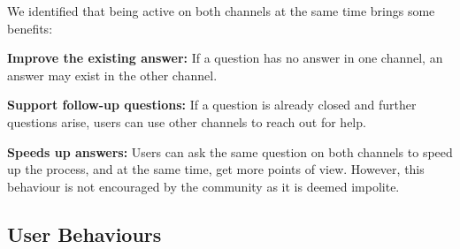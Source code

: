     We identified that being active on both channels at the same time brings some benefits:
    \begin{packed_enum}
        \item \textbf{Improve the existing answer:} If a question has no answer in one channel, an answer may exist in the other channel.
        \item \textbf{Support follow-up questions:} If a question is already closed and further questions arise, users can use other channels to reach out for help.
        \item \textbf{Speeds up answers:} Users can ask the same question on both channels to speed up the process, and at the same time, get more points of view. However, this behaviour is not encouraged by the community as it is deemed impolite.
    \end{packed_enum}

\subsection{User Behaviours}
\label{sec:userbeh}

